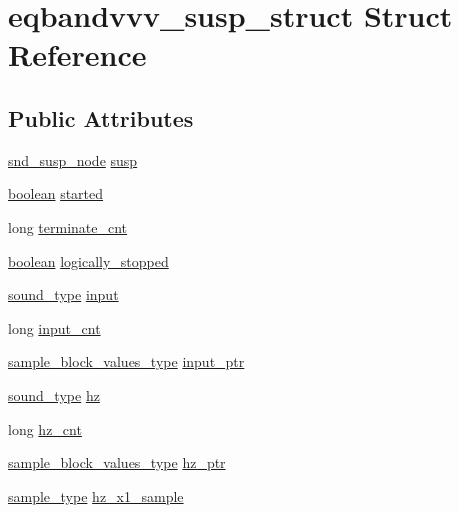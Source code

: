 \hypertarget{structeqbandvvv__susp__struct}{}\section{eqbandvvv\+\_\+susp\+\_\+struct Struct Reference}
\label{structeqbandvvv__susp__struct}
\subsection*{Public Attributes}
\begin{DoxyCompactItemize}
\item 
\hyperlink{sound_8h_a6b268203688a934bd798ceb55f85d4c0}{snd\+\_\+susp\+\_\+node} \hyperlink{structeqbandvvv__susp__struct_a5df859a0b24b474107f34866d35f9f6a}{susp}
\item 
\hyperlink{cext_8h_a7670a4e8a07d9ebb00411948b0bbf86d}{boolean} \hyperlink{structeqbandvvv__susp__struct_a357c08cc1febc2e285c2febc9d9565b1}{started}
\item 
long \hyperlink{structeqbandvvv__susp__struct_a1eed22369840718d847dd96e67962c6b}{terminate\+\_\+cnt}
\item 
\hyperlink{cext_8h_a7670a4e8a07d9ebb00411948b0bbf86d}{boolean} \hyperlink{structeqbandvvv__susp__struct_a3f47523fde9dcffe7ac2b42aca7dda82}{logically\+\_\+stopped}
\item 
\hyperlink{sound_8h_a792cec4ed9d6d636d342d9365ba265ea}{sound\+\_\+type} \hyperlink{structeqbandvvv__susp__struct_aca61cf255798f7a788d3e478eeb389a6}{input}
\item 
long \hyperlink{structeqbandvvv__susp__struct_a0d67949691ceed8233014cb15f896aff}{input\+\_\+cnt}
\item 
\hyperlink{sound_8h_a83d17f7b465d1591f27cd28fc5eb8a03}{sample\+\_\+block\+\_\+values\+\_\+type} \hyperlink{structeqbandvvv__susp__struct_a9a55cbabae2cb4eef073ba118cb5be20}{input\+\_\+ptr}
\item 
\hyperlink{sound_8h_a792cec4ed9d6d636d342d9365ba265ea}{sound\+\_\+type} \hyperlink{structeqbandvvv__susp__struct_a5854534a1c7512dfe3ef4d5f93c6a565}{hz}
\item 
long \hyperlink{structeqbandvvv__susp__struct_a9e6ed1c95e00b79f6e11ca280235ac8c}{hz\+\_\+cnt}
\item 
\hyperlink{sound_8h_a83d17f7b465d1591f27cd28fc5eb8a03}{sample\+\_\+block\+\_\+values\+\_\+type} \hyperlink{structeqbandvvv__susp__struct_a620b4329d9d580359dce407e633cb17d}{hz\+\_\+ptr}
\item 
\hyperlink{sound_8h_a3a9d1d4a1c153390d2401a6e9f71b32c}{sample\+\_\+type} \hyperlink{structeqbandvvv__susp__struct_ab663c568545e71caec6606d9c7cbfd39}{hz\+\_\+x1\+\_\+sample}

\end{DoxyCompactItemize}
